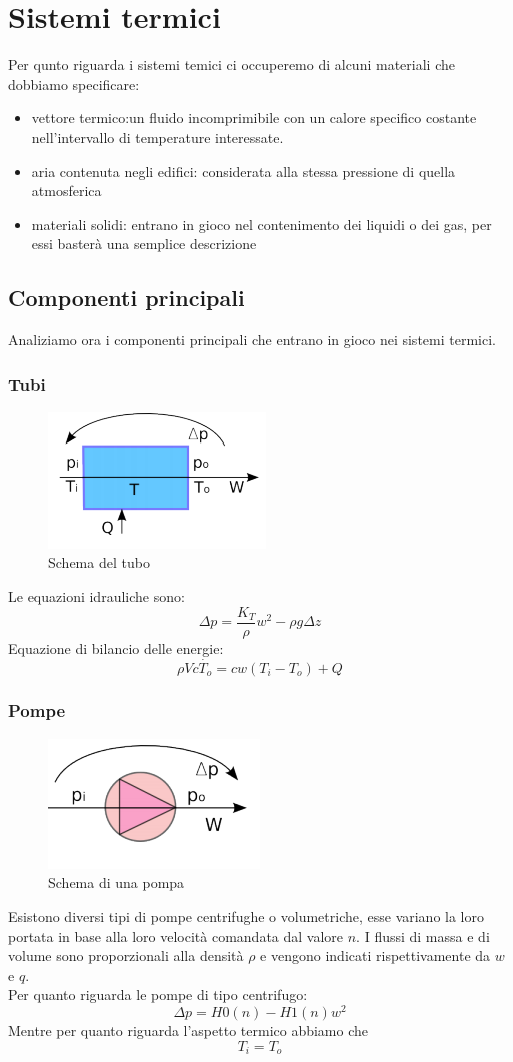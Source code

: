 \label{capitolo7}
\section{Sistemi termici}
Per qunto riguarda i sistemi temici ci occuperemo di alcuni materiali che dobbiamo specificare:
\begin{itemize}
\item vettore termico:un fluido incomprimibile con un calore specifico costante nell'intervallo di temperature interessate.
\item aria contenuta negli edifici: considerata alla stessa pressione di quella atmosferica
\item materiali solidi: entrano in gioco nel contenimento dei liquidi o dei gas, per essi basterà una semplice descrizione
\end{itemize}
\subsection{Componenti principali}
Analiziamo ora i componenti principali che entrano in gioco nei sistemi termici.
\subsubsection{Tubi}
\begin{figure}[tbh]
\centering
\includegraphics{img/tubo2.png}
\caption{Schema del tubo}
\label{fig:tubo2}
\end{figure}
Le equazioni idrauliche sono:
$$
\Delta p= \frac{K_T}{\rho}w^2-\rho g \Delta z
$$
Equazione di bilancio delle energie:
$$
\rho V c \dot{T_o}=cw(T_i-T_o)+Q
$$
\subsubsection{Pompe}
\begin{figure}[tbh]
\centering
\includegraphics{img/pompa2.png}
\caption{Schema di una pompa}
\label{fig:pompa2}
\end{figure}
Esistono diversi tipi di pompe centrifughe o volumetriche, esse variano la loro portata in base alla loro velocità comandata dal valore $n$. I flussi di massa e di volume sono proporzionali alla densità $\rho$ e vengono indicati rispettivamente da $w$ e $q$.\\
Per quanto riguarda le pompe di tipo centrifugo:
$$
\Delta p= H0(n)-H1(n)w^2
$$
Mentre per quanto riguarda l'aspetto termico abbiamo che 
$$T_i=T_o$$
